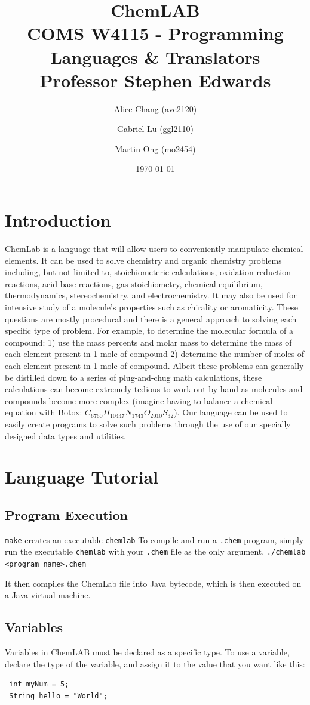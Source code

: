 \documentclass[11pt]{report}
\title{ChemLAB \\
COMS W4115 - Programming Languages \& Translators \\
Professor Stephen Edwards}
\author{Alice Chang (avc2120) \and Gabriel Lu (ggl2110) \and Martin Ong (mo2454)}
\date{\today}             %
\begin{document}
\maketitle
\tableofcontents

\chapter*{Introduction}
ChemLab is a language that will allow users to conveniently manipulate chemical elements. It can be used to solve chemistry and organic chemistry problems including, but not limited to, stoichiometeric calculations, oxidation-reduction reactions, acid-base reactions, gas stoichiometry, chemical equilibrium, thermodynamics, stereochemistry, and electrochemistry. It may also be used for intensive study of a molecule's properties such as chirality or aromaticity. These questions are mostly procedural and there is a general approach to solving each specific type of problem. For example, to determine the molecular formula of a compound: 1) use the mass percents and molar mass to determine the mass of each element present in 1 mole of compound 2) determine the number of moles of each element present in 1 mole of compound. Albeit these problems can generally be distilled down to a series of plug-and-chug math calculations, these calculations can become extremely tedious to work out by hand as molecules and compounds become more complex (imagine having to balance a chemical equation with Botox: $C_{6760}H_{10447}N_{1743}O_{2010}S_{32}$). Our language can be used to easily create programs to solve such problems through the use of our specially designed data types and utilities.

\chapter{Language Tutorial}
\section{Program Execution}
\texttt{make} creates an executable \texttt{chemlab}
To compile and run a \texttt{.chem} program, simply run the executable \texttt{chemlab} with your \texttt{.chem} file as the only argument.
\texttt{./chemlab <program name>.chem}

It then compiles the ChemLab file into Java bytecode, which is then executed on a Java virtual machine.

\section{Variables}
Variables in ChemLAB must be declared as a specific type. To use a variable, declare the type of the variable, and assign it to the value that you want like this:
 \begin{verbatim}
 int myNum = 5;
 String hello = "World"; 
 \end{verbatim}
\end{document}
